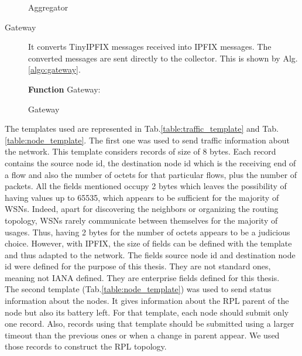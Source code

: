 \begin{description}
\begin{algorithm}
{			
    }
   \caption{Aggregator}
   \label{algo:aggregator}
  \end{algorithm}

  \item[Gateway] It converts TinyIPFIX messages received into IPFIX messages. The converted messages are sent directly to the collector. This is shown by Alg.\ref{algo:gateway}.

  \begin{algorithm}
    \textbf{Function} Gateway:\\
   \caption{Gateway}
   \label{algo:gateway}
  \end{algorithm}

\end{description}

The templates used are represented in Tab.\ref{table:traffic_template} and Tab.\ref{table:node_template}. The first one was used to send traffic information about the network. This template considers records of size of 8 bytes. Each record contains the source node id, the destination node id which is the receiving end of a flow and also the number of octets for that particular flows, plus the number of packets. All the fields mentioned occupy 2 bytes which leaves the possibility of having values up to 65535, which appears to be sufficient for the majority of WSNs. Indeed, apart for discovering the neighbors or organizing the routing topology, WSNs rarely communicate between themselves for the majority of usages. Thus, having 2 bytes for the number of octets appears to be a judicious choice. However, with IPFIX, the size of fields can be defined with the template and thus adapted to the network. The fields source node id and destination node id were defined for the purpose of this thesis. They are not standard ones, meaning not IANA defined. They are enterprise fields defined for this thesis. \\

The second template (Tab.\ref{table:node_template}) was used to send status information about the nodes. It gives information about the RPL parent of the node but also its battery left. For that template, each node should submit only one record. Also, records using that template should be submitted using a larger timeout than the previous ones or when a change in parent appear. We used those records to construct the RPL topology.

